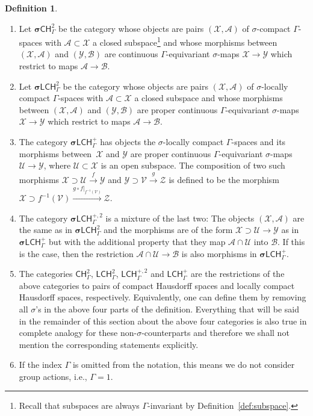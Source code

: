 \documentclass[pdftex]{sigma}
\numberwithin{equation}{section}
\theoremstyle{definition}
\newtheorem{defn}[thm]{Definition}
\newcommand{\cZ}{\mathcal{Z}}
\newcommand{\cX}{\mathcal{X}}
\newcommand{\cY}{\mathcal{Y}}
\newcommand{\cA}{\mathcal{A}}
\newcommand{\cB}{\mathcal{B}}
\newcommand{\cU}{\mathcal{U}}
\newcommand{\cV}{\mathcal{V}}
\newcommand{\categoryfont}[1]{\mathsf{#1}}
\newcommand{\sLCHz}[1][\Gamma]{\boldsymbol\sigma\categoryfont{LCH}_{#1}^2}
\newcommand{\sLCHp}[1][\Gamma]{\boldsymbol\sigma\categoryfont{LCH}_{#1}^+}
\newcommand{\sLCHzp}[1][\Gamma]{\boldsymbol\sigma\categoryfont{LCH}_{#1}^{+,2}}
\newcommand{\sCHz}[1][\Gamma]{\boldsymbol\sigma\categoryfont{CH}_{#1}^2}
\newcommand{\LCHz}[1][\Gamma]{\categoryfont{LCH}_{#1}^2}
\newcommand{\LCHp}[1][\Gamma]{\categoryfont{LCH}_{#1}^+}
\newcommand{\LCHzp}[1][\Gamma]{\categoryfont{LCH}_{#1}^{+,2}}
\newcommand{\CHz}[1][\Gamma]{\categoryfont{CH}_{#1}^2}
\begin{document}
\begin{defn}\quad
\begin{enumerate}\itemsep=0pt
\item[$\bullet$] Let $\sCHz$ be the category whose objects are pairs $(\cX,\cA)$ of $\sigma$-compact $\Gamma$-spaces with $\cA\subset\cX$ a closed subspace\footnote{Recall that subspaces are always $\Gamma$-invariant by Definition~\ref{def:subspace}.} and whose morphisms between $(\cX,\cA)$ and $(\cY,\cB)$ are continuous $\Gamma$-equivariant $\sigma$-maps $\cX\to\cY$ which restrict to maps $\cA\to\cB$.
\item[$\bullet$] Let $\sLCHz$ be the category whose objects are pairs $(\cX,\cA)$ of $\sigma$-locally compact $\Gamma$-spaces with $\cA\subset\cX$ a closed subspace and whose morphisms between $(\cX,\cA)$ and $(\cY,\cB)$ are proper continuous $\Gamma$-equivariant $\sigma$-maps $\cX\to\cY$ which restrict to maps $\cA\to\cB$.
\item[$\bullet$] The category $\sLCHp$ has objects the $\sigma$-locally compact $\Gamma$-spaces and its morphisms between~$\cX$ and $\cY$ are proper continuous $\Gamma$-equivariant $\sigma$-maps $\cU\to\cY$, where $\cU\subset\cX$ is an open subspace. The composition of two such morphisms $\cX\supset\cU\xrightarrow{f}\cY$ and $\cY\supset\cV\xrightarrow{g}\cZ$ is defined to be the morphism $\cX\supset f^{-1}(\cV)\xrightarrow{g\circ f|_{f^{-1}(\cV)}}\cZ$.
\item[$\bullet$] The category $\sLCHzp$ is a mixture of the last two: The objects $(\cX,\cA)$ are the same as in $\sLCHz$ and the morphisms are of the form $\cX \supset \cU\to\cY$ as in $\sLCHp$ but with the additional property that they map $\cA\cap \cU$ into $\cB$. If this is the case, then the restriction $\cA\cap\cU\to\cB$ is also morphisms in $\sLCHp$.
\item[$\bullet$] The categories $\CHz$, $\LCHz$, $\LCHzp$ and $\LCHp$ are the restrictions of the above categories to pairs of compact Hausdorff spaces and locally compact Hausdorff spaces, respectively. Equivalently, one can define them by removing all $\sigma$'s in the above four parts of the definition. Everything that will be said in the remainder of this section about the above four categories is also true in complete analogy for these non-$\sigma$-counterparts and therefore we shall not mention the corresponding statements explicitly.
\item[$\bullet$] If the index $\Gamma$ is omitted from the notation, this means we do not consider group actions, i.e., $\Gamma=1$.
\end{enumerate}
\end{defn}
\end{document}
